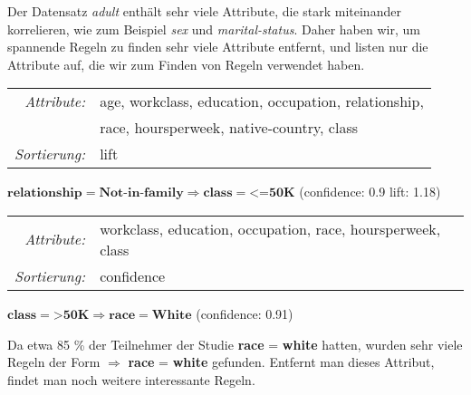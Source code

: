 
Der Datensatz \emph{adult} enth\"alt sehr viele Attribute, die stark miteinander korrelieren, wie zum Beispiel \emph{sex} und \emph{marital-status}. Daher haben wir, um spannende Regeln zu finden sehr viele Attribute entfernt, und listen nur die Attribute auf, die wir zum Finden von Regeln verwendet haben.

\vspace{0.1cm} 

\begin{boxedminipage}{\textwidth}
\begin{tabular}{rl}
\emph{Attribute:}  & age, workclass, education, occupation, relationship, \\
                   & race, hoursperweek, native-country, class \\
\emph{Sortierung:} &  lift \\
\end{tabular}
\vspace{0.3cm}

$\textbf{relationship} = \textbf{Not-in-family} \Longrightarrow \textbf{class} = \textbf{<=50K} $ (confidence: 0.9 lift: 1.18)
\end{boxedminipage} \vspace{0.1cm}

\vspace{0.1cm} 

\begin{boxedminipage}{\textwidth}
\begin{tabular}{rl}
\emph{Attribute:}  & workclass, education, occupation, race, hoursperweek, class \\
\emph{Sortierung:} &  confidence \\
\end{tabular}
\vspace{0.3cm}
$\textbf{class} = \textbf{>50K} \Longrightarrow \textbf{race} = \textbf{White}$    (confidence: 0.91)
\end{boxedminipage} \vspace{0.1cm}

Da etwa 85 \% der Teilnehmer der Studie \textbf{race} = \textbf{white} hatten, wurden sehr viele Regeln der Form $\Longrightarrow$ \textbf{race} = \textbf{white} gefunden. Entfernt man dieses Attribut, findet man noch weitere interessante Regeln.

\vspace{0.1cm} 

